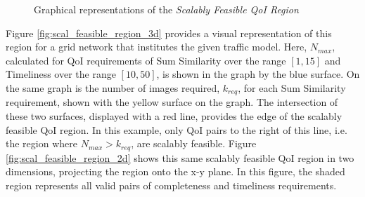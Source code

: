 \begin{figure}[ht]
	\caption{Graphical representations of the \emph{Scalably Feasible QoI Region}}
	\label{fig:scal_feasible_region}
\end{figure}

Figure \ref{fig:scal_feasible_region_3d} provides a visual representation of this region for a grid network that institutes the given traffic model.
Here, $N_{max}$, calculated for QoI requirements of Sum Similarity over the range $[1, 15]$ and Timeliness over the range $[10, 50]$,
is shown in the graph by the blue surface.  On the same graph is the number of images required, $k_{req}$, for each Sum Similarity requirement, shown with the yellow surface on the graph.  The intersection of these two surfaces, displayed with a red line, provides the edge of the scalably feasible QoI region.  In this example, only QoI pairs to the right of this line, i.e. the region where $N_{max} > k_{req}$, are scalably feasible.  Figure \ref{fig:scal_feasible_region_2d} shows this same scalably feasible QoI region in two dimensions, projecting the region onto the x-y plane.  In this figure, the shaded region represents all valid pairs of completeness and timeliness requirements.

